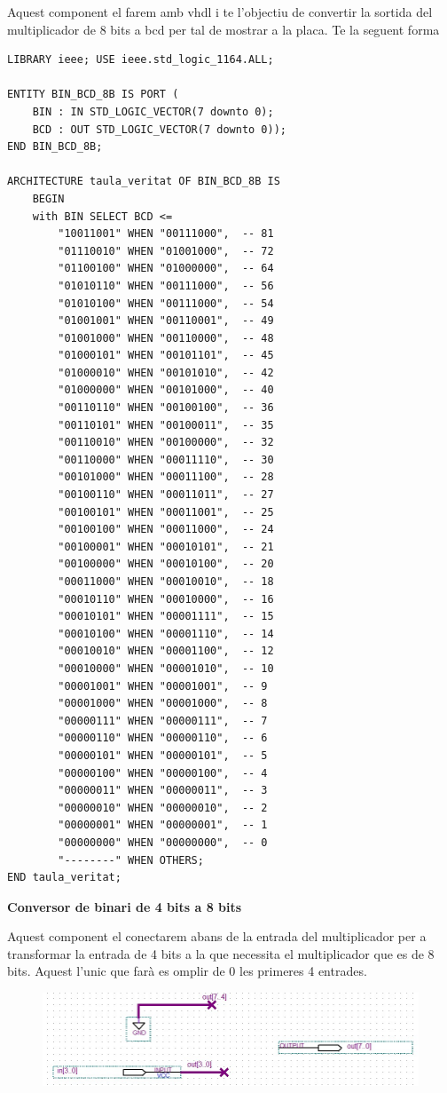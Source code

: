 \documentclass[12pt, a4papre]{article}
\begin{document}
	Aquest component el farem amb vhdl i te l'objectiu de convertir la sortida del multiplicador de 8 bits a bcd per tal de mostrar a la placa. Te la seguent forma
	\begin{lstlisting}[style=vhdl, frame=single, basicstyle=\tiny]
LIBRARY ieee; USE ieee.std_logic_1164.ALL;  

ENTITY BIN_BCD_8B IS PORT (   
	BIN : IN STD_LOGIC_VECTOR(7 downto 0);   
	BCD : OUT STD_LOGIC_VECTOR(7 downto 0)); 
END BIN_BCD_8B;  

ARCHITECTURE taula_veritat OF BIN_BCD_8B IS   
	BEGIN 
	with BIN SELECT BCD <=     	
		"10011001" WHEN "00111000",  -- 81     
		"01110010" WHEN "01001000",  -- 72      
		"01100100" WHEN "01000000",  -- 64     
		"01010110" WHEN "00111000",  -- 56     
		"01010100" WHEN "00111000",  -- 54        
		"01001001" WHEN "00110001",  -- 49     
		"01001000" WHEN "00110000",  -- 48     
		"01000101" WHEN "00101101",  -- 45     
		"01000010" WHEN "00101010",  -- 42     
		"01000000" WHEN "00101000",  -- 40     
		"00110110" WHEN "00100100",  -- 36     
		"00110101" WHEN "00100011",  -- 35     
		"00110010" WHEN "00100000",  -- 32     
		"00110000" WHEN "00011110",  -- 30     
		"00101000" WHEN "00011100",  -- 28     
		"00100110" WHEN "00011011",  -- 27     
		"00100101" WHEN "00011001",  -- 25     
		"00100100" WHEN "00011000",  -- 24     
		"00100001" WHEN "00010101",  -- 21     
		"00100000" WHEN "00010100",  -- 20     
		"00011000" WHEN "00010010",  -- 18     
		"00010110" WHEN "00010000",  -- 16     
		"00010101" WHEN "00001111",  -- 15     
		"00010100" WHEN "00001110",  -- 14     
		"00010010" WHEN "00001100",  -- 12     
		"00010000" WHEN "00001010",  -- 10     
		"00001001" WHEN "00001001",  -- 9     
		"00001000" WHEN "00001000",  -- 8     
		"00000111" WHEN "00000111",  -- 7     
		"00000110" WHEN "00000110",  -- 6     
		"00000101" WHEN "00000101",  -- 5     
		"00000100" WHEN "00000100",  -- 4    
		"00000011" WHEN "00000011",  -- 3     
		"00000010" WHEN "00000010",  -- 2     
		"00000001" WHEN "00000001",  -- 1     
		"00000000" WHEN "00000000",  -- 0     
		"--------" WHEN OTHERS;   
END taula_veritat;
\end{lstlisting}
	
	\textbf{\large{Conversor de binari de 4 bits a 8 bits}}
	
	Aquest component el conectarem abans de la entrada del multiplicador per a transformar la entrada de 4 bits a la que necessita el multiplicador que es de 8 bits. Aquest l'unic que farà es omplir de 0 les primeres 4 entrades.
	\begin{figure}[H]
		\begin{center}
		\includegraphics[width=130mm]{Bin_4_8.jpeg}
		\end{center}
	\end{figure}
	
\end{document}
